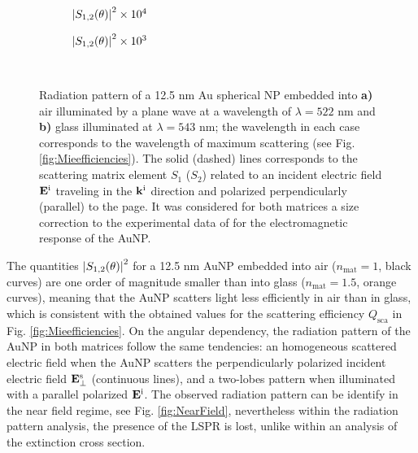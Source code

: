 \begin{figure}[t!]
	\small\centering
	\def\svgwidth{.9\textwidth}
		\vspace*{1.5em}
		\hspace*{-.25\textwidth}
	\begin{subfigure}{.45\textwidth}%
		\caption{$\abs{S_{1,2}(\theta)}^2\times 10^4$} \label{fig:ScatteringMaps:a}%
		\end{subfigure}%
	\begin{subfigure}{.45\textwidth}%
		\caption{$\abs{S_{1,2}(\theta)}^2\times 10^3$}\label{fig:ScatteringMaps:b}%
		\end{subfigure}%
	\vspace*{-4.5em}\\
	\vspace*{-.5em}
	\caption[Radiation Pattern of a 12.5 nm Au Spherical NP embedded into Air and Glass]{Radiation pattern of a 12.5 nm Au spherical NP embedded into \textbf{a)} air illuminated by a plane wave at a wavelength of $\lambda = 522$ nm and \textbf{b)} glass illuminated at $\lambda = 543$ nm; the wavelength in each case corresponds to the wavelength of maximum scattering (see Fig. \ref{fig:Mieefficiencies}). The solid (dashed) lines corresponds to the scattering matrix element $S_1$ ($S_2$) related to an incident electric field $\vb{E}^\text{i}$ traveling in the $\vb{k}^\text{i}$ direction  and polarized perpendicularly (parallel) to the page. It was considered for both matrices a size correction to the experimental data of \citeauthor{johnson_optical_1972} \cite{johnson_optical_1972} for the electromagnetic response of the AuNP.}
	\label{fig:ScatteringMaps}
 \end{figure}

The quantities $\abs{S_{1,2}(\theta)}^2$ for a 12.5 nm AuNP embedded into air ($n_\text{mat} = 1$, black curves) are one order of magnitude smaller  than into glass ($n_\text{mat} = 1.5$, orange curves), meaning that the AuNP scatters light less efficiently in air than in glass, which is consistent with the obtained values for the scattering efficiency $Q_\text{sca}$ in Fig. \ref{fig:Mieefficiencies}. On the angular dependency, the radiation pattern of the AuNP in both matrices follow the same tendencies: an homogeneous scattered electric field when the AuNP scatters the perpendicularly polarized incident electric field  $\vb{E}^\text{s}_\perp$ (continuous lines), and a two-lobes pattern when illuminated with a parallel polarized $\vb{E}^\text{i}$. The observed radiation pattern can be identify in the near field regime, see Fig. \ref{fig:NearField}, nevertheless within the radiation pattern analysis, the presence of the LSPR is lost, unlike within an analysis of the extinction cross section.
